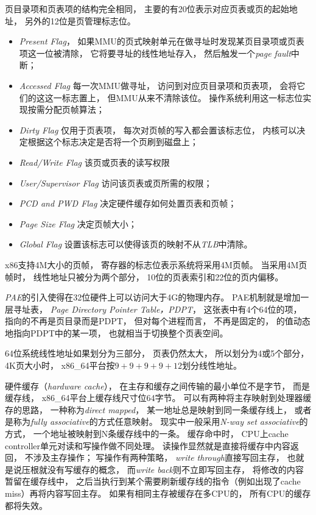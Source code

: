 页目录项和页表项的结构完全相同，
主要的有20位表示对应页表或页的起始地址，
另外的12位是页管理标志位。
\begin{itemize}
\item {\em Present Flag}，
  如果MMU的页式映射单元在做寻址时发现某页目录项或页表项这一位被清除，
  它将要寻址的线性地址存入，
  然后触发一个{\em page fault}中断；
\item {\em Accessed Flag}
  每一次MMU做寻址，
  访问到对应页目录项和页表项，
  会将它们的这这一标志置上，
  但MMU从来不清除该位。
  操作系统利用这一标志位实现按需分配页帧算法；
\item {\em Dirty Flag}
  仅用于页表项，
  每次对页帧的写入都会置该标志位，
  内核可以决定根据这个标志决定是否将一个页刷到磁盘上；
\item {\em Read/Write Flag}
  该页或页表的读写权限
\item {\em User/Supervisor Flag}
  访问该页表或页所需的权限；
\item {\em PCD and PWD Flag}
  决定硬件缓存如何处置页表和页帧；
\item {\em Page Size Flag}
  决定页帧大小；
\item {\em Global Flag}
  设置该标志可以使得该页的映射不从{\em TLB}中清除。
\end{itemize}

x86支持4M大小的页帧，
寄存器的标志位表示系统将采用4M页帧。
当采用4M页帧时，
线性地址只被分为两个部分，
10位的页表索引和22位的页内偏移。

{\em PAE}的引入使得在32位硬件上可以访问大于4G的物理内存。
PAE机制就是增加一层寻址表，
{\em Page Directory Pointer Table，PDPT}，
这张表中有4个64位的项，
指向的不再是页目录而是PDPT，
但对每个进程而言，
不再是固定的，
的值动态地指向PDPT中的某一项，
也就相当于切换整个页表空间。

64位系统线性地址如果划分为三部分，
页表仍然太大，
所以划分为4或5个部分，
4K页大小时，
x86\_64平台按$9 + 9 + 9 + 9 + 12$划分线性地址。

硬件缓存（{\em hardware cache}），
在主存和缓存之间传输的最小单位不是字节，
而是缓存线，
x86\_64平台上缓存线尺寸位64字节。
可以有两种将主存映射到处理器缓存的思路，
一种称为{\em direct mapped}，
某一地址总是映射到同一条缓存线上，
或者是称为{\em fully associative}的方式任意映射。
现实中一般采用{\em N-way set associative}的方式，
一个地址被映射到N条缓存线中的一条。
缓存命中时，
CPU上cache controller单元对读和写操作做不同处理。
读操作显然就是直接将缓存中内容返回，
不涉及主存操作；
写操作有两种策略，
{\em write through}直接写回主存，
也就是说压根就没有写缓存的概念，
而{\em write back}则不立即写回主存，
将修改的内容暂留在缓存线中，
之后当执行到某个需要刷新缓存线的指令（例如出现了cache miss）再将内容写回主存。
如果有相同主存被缓存在多CPU的，
所有CPU的缓存都将失效。
